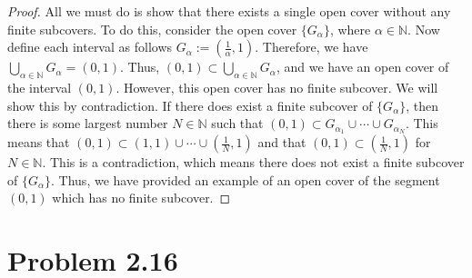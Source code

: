 \documentclass[psamsfonts]{amsart}
\theoremstyle{definition}
\theoremstyle{remark}
\numberwithin{equation}{section}
\begin{document}
\begin{proof}
All we must do is show that there exists a single open cover without any finite subcovers. To do this, consider the open cover $\{ G_\alpha \}$, where $\alpha \in \mathbb{N}$. Now define each interval as follows $G_\alpha := (\frac{1}{\alpha},1)$. Therefore, we have $\bigcup_{\alpha \in \mathbb{N}} G_\alpha = (0,1)$. Thus, $(0,1) \subset \bigcup_{\alpha \in \mathbb{N}} G_\alpha$, and we have an open cover of the interval $(0,1)$. However, this open cover has no finite subcover. We will show this by contradiction. If there does exist a finite subcover of $\{G_\alpha\}$, then there is some largest number $N \in \mathbb{N}$ such that $(0,1) \subset G_{\alpha_1} \cup \cdots \cup G_{\alpha_N}$. This means that $(0,1) \subset (1,1) \cup \cdots \cup (\frac{1}{N},1)$ and that $(0,1) \subset (\frac{1}{N},1)$ for $N \in \mathbb{N}$. This is a contradiction, which means there does not exist a finite subcover of $\{G_\alpha\}$. Thus, we have provided an example of an open cover of the segment $(0,1)$ which has no finite subcover. 
\end{proof}

\section{Problem 2.16}
\end{document}
